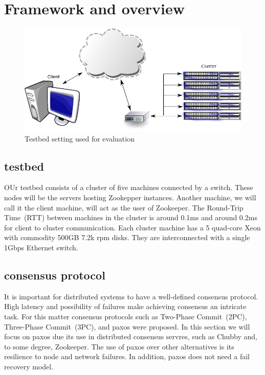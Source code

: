 \section{Framework and overview}\label{sec:framework}

\begin{figure}[h]
\centering
\includegraphics[scale=0.85]{img/framework.eps}
\caption{Testbed setting used for evaluation}
\label{fig:framework}
\end{figure}

\subsection{testbed}
OUr testbed consists of a cluster of five machines connected by a switch. These nodes will be the servers hosting Zookepper instances. Another machine, we will call it the client machine, will act as the user of Zookeeper. The Round-Trip Time~(RTT) between machines in the cluster is around 0.1ms and around 0.2ms for client to cluster communication. Each cluster machine has a 5 quad-core Xeon  with commodity 500GB 7.2k rpm disks. They are interconnected with a single 1Gbps Ethernet switch.

\subsection{consensus protocol}
It is important for distributed systems to have a well-defined consensus protocol. High latency and possibility of failures make achieving consensus an intricate task. For this matter consensus protocols such as Two-Phase Commit~(2PC), Three-Phase Commit~(3PC), and paxos were proposed. In this section we will focus on paxos due its use in distributed consensus servres, such as Chubby and, to some degree, Zookeeper. The use of paxos over other alternatives is its resilience to node and network failures. In addition, paxos does not need a fail recovery model.

